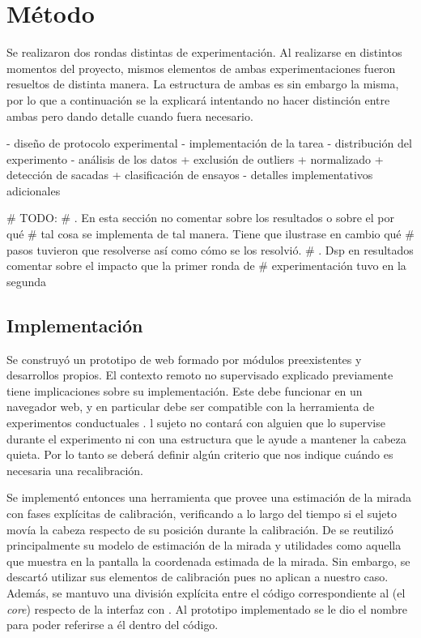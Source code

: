 \section{Método}

Se realizaron dos rondas distintas de experimentación.
Al realizarse en distintos momentos del proyecto, mismos elementos de ambas
experimentaciones fueron resueltos de distinta manera.
La estructura de ambas es sin embargo la misma, por lo que a continuación se la
explicará intentando no hacer distinción entre ambas pero dando detalle cuando
fuera necesario.

  - diseño de protocolo experimental
  - implementación de la tarea
  - distribución del experimento
  - análisis de los datos
    + exclusión de outliers
    + normalizado
    + detección de sacadas
    + clasificación de ensayos
  - detalles implementativos adicionales

# TODO:
#       . En esta sección no comentar sobre los resultados o sobre el por qué 
#       tal cosa se implementa de tal manera. Tiene que ilustrase en cambio qué
#       pasos tuvieron que resolverse así como cómo se los resolvió.
#       . Dsp en resultados comentar sobre el impacto que la primer ronda de
#       experimentación tuvo en la segunda

\subsection{Implementación}

Se construyó un prototipo de \eyetracker web formado por módulos preexistentes
y desarrollos propios.
El contexto remoto no supervisado explicado previamente tiene implicaciones
sobre su implementación.
Este debe funcionar en un navegador web, y en particular debe ser compatible
con la herramienta de experimentos conductuales \jspsych. 
l sujeto no contará con alguien que lo supervise durante el experimento ni con
una estructura que le ayude a mantener la cabeza quieta.
Por lo tanto se deberá definir algún criterio que nos indique cuándo es
necesaria una recalibración.

Se implementó entonces una herramienta que provee una estimación de la mirada
con fases explícitas de calibración, verificando a lo largo del tiempo si el
sujeto movía la cabeza respecto de su posición durante la calibración.
De \webgazer se reutilizó principalmente su modelo de estimación de la mirada y
utilidades como aquella que muestra en la pantalla la coordenada estimada de la
mirada.
Sin embargo, se descartó utilizar sus elementos de calibración pues no aplican
a nuestro caso.
Además, se mantuvo una división explícita entre el código correspondiente al
\eyetracking (el \textit{core}) respecto de la interfaz con \jspsych.
Al prototipo implementado se le dio el nombre \rastoc para poder referirse a él
dentro del código.

